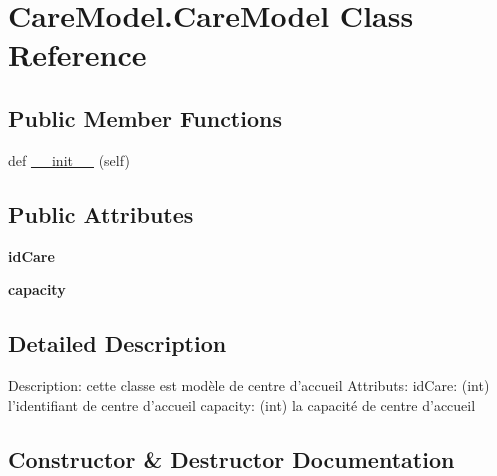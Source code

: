 \hypertarget{class_care_model_1_1_care_model}{}\section{Care\+Model.\+Care\+Model Class Reference}
\label{class_care_model_1_1_care_model}
\subsection*{Public Member Functions}
\begin{DoxyCompactItemize}
\item 
def \mbox{\hyperlink{class_care_model_1_1_care_model_a89ed2bb8eb519313f953b5400fadf0e5}{\+\_\+\+\_\+init\+\_\+\+\_\+}} (self)
\end{DoxyCompactItemize}
\subsection*{Public Attributes}
\begin{DoxyCompactItemize}
\item 
\mbox{\label{class_care_model_1_1_care_model_a1d587f35cbf47cd81d9a9cd5420e1590}} 
{\bfseries id\+Care}
\item 
\mbox{\label{class_care_model_1_1_care_model_afbeacc40fa3fbedaebf724a0c269177f}} 
{\bfseries capacity}
\end{DoxyCompactItemize}


\subsection{Detailed Description}
\begin{DoxyVerb}Description: cette classe est modèle de centre d'accueil
Attributs:
    idCare: (int) l'identifiant de centre d'accueil
    capacity: (int) la capacité de centre d'accueil
\end{DoxyVerb}
 

\subsection{Constructor \& Destructor Documentation}
\mbox{\label{class_care_model_1_1_care_model_a89ed2bb8eb519313f953b5400fadf0e5}} 
